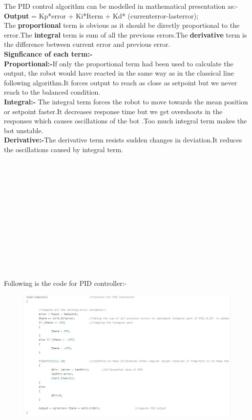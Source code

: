 \documentclass[12pt]{report}
\begin{document}
    The PID control algorithm can be modelled in mathematical presentation as:- \\
    \textbf{Output} = Kp*error + Ki*Iterm + Kd* (currenterror-lasterror);\\
   
    The \textbf{proportional} term is obvious as it should be directly proportional to the error.The \textbf{integral} term is sum of all the previous errors.The \textbf{derivative} term is the difference between current error and previous error.\\
    \textbf{Signficance of each term:-}\\
    \textbf{Proportional:-}If only the proportional term had been used to calculate the output, the robot would have reacted in the same way as in the classical line following algorithm.It forces output to reach as close as setpoint but we never reach to the balanced condition.\\
    \textbf{Integral:-} The integral term forces the robot to move towards the mean position or setpoint faster.It decreases response time but we get overshoots in the responses which causes oscillations of the bot .Too much integral term  makes the bot unstable.\\
    \textbf{Derivative:-}The derivative term resists sudden changes in deviation.It reduces the oscillations caused by integral term.\\ \\
     \\ \\ \\ \\ \\ \\ \\ \\ \\ \\ \\ \\
    Following is the code for PID controller:-
    \begin{figure}[h]
    	\includegraphics[scale=0.6]{PID_CODE.jpg}
    \end{figure} \\
\end{document}
